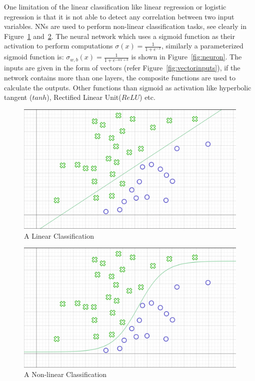One limitation of the linear classification like linear regression or logistic regression is that it is not able to detect any correlation between two input variables. NNs are used to perform non-linear classification tasks, 
see clearly in Figure~\ref{fig:linearclassification} and~\ref{fig:nonlinearclassification}. The neural network which uses a sigmoid function as their activation to perform computations $\sigma(x) = \frac{1}{1+e^{-x}}$, similarly a parameterized sigmoid function is: $\sigma_{w,b}(x) = \frac{1}{1+e^{-wx+b}}$ is shown in Figure~\ref{fig:neuron}. The inputs are given in the form of vectors (refer Figure~\ref{fig:vectorinputs}), if the network contains more than one layers, the composite functions are used to calculate the outputs. Other functions than sigmoid as activation like hyperbolic tangent  ($tanh$), Rectified Linear Unit($ReLU$) etc. 
\begin{figure}[!htb]
    \centering
    \includegraphics[scale=0.2]{Figures/non-linear_classification.png}
    \caption{A Linear Classification}
    \label{fig:linearclassification}
\end{figure}
\begin{figure}[!htb]
    \centering
    \includegraphics[scale=0.2]{Figures/linear_classification.png}
    \caption{A Non-linear Classification}
    \label{fig:nonlinearclassification}
\end{figure}
